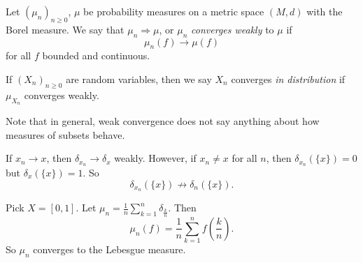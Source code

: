 \documentclass[a4paper]{article}
\begin{document}
\begin{defi}
  Let $(\mu_n)_{n \geq 0}$, $\mu$ be probability measures on a metric space $(M, d)$ with the Borel measure. We say that $\mu_n \Rightarrow \mu$, or $\mu_n$ \emph{converges weakly} to $\mu$ if
  \[
    \mu_n(f) \to \mu(f)
  \]
  for all $f$ bounded and continuous.

  If $(X_n)_{n \geq 0}$ are random variables, then we say $X_n$ converges \emph{in distribution} if $\mu_{X_n}$ converges weakly.
\end{defi}
Note that in general, weak convergence does not say anything about how measures of subsets behave.
\begin{eg}
  If $x_n \to x$, then $\delta_{x_n} \to \delta_x$ weakly. However, if $x_n \not= x$ for all $n$, then $\delta_{x_n} (\{x\}) = 0$ but $\delta_x(\{x\}) = 1$. So
  \[
    \delta_{x_n}(\{x\}) \not\to \delta_n(\{x\}).
  \]
\end{eg}

\begin{eg}
  Pick $X = [0, 1]$. Let $\mu_n = \frac{1}{n} \sum_{k = 1}^n \delta_{\frac{k}{n}}$. Then
  \[
    \mu_n(f) = \frac{1}{n} \sum_{k = 1}^n f\left(\frac{k}{n}\right).
  \]
  So $\mu_n$ converges to the Lebesgue measure.
\end{eg}
\end{document}
